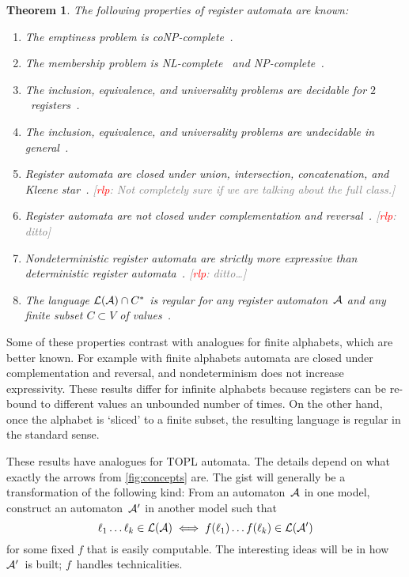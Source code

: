 \documentclass[9pt, preprint]{sigplanconf} %
\newcommand{\noterg}[2]{\textcolor{gray}{[\textcolor{red}{#1}: #2]}}
\newcommand{\rlp}[1]{\noterg{rlp}{#1}}
\newtheorem{theorem}{Theorem}
\theoremstyle{definition}
\theoremstyle{remark}
\begin{document}
\begin{theorem}\label{th:ra}
The following properties of register automata are known:
\begin{enumerate}
\item The emptiness problem is coNP-complete~\cite{dblp:journals/tcs/sakamotoi00}.
\item The membership problem is NL-complete~\cite{dblp:conf/mfcs/nevensv01} and NP-complete~\cite{dblp:journals/tcs/sakamotoi00}.
\item The inclusion, equivalence, and universality problems are decidable for $2$~registers~\cite{dblp:conf/focs/kaminskif90,dblp:conf/mfcs/nevensv01}.
\item The inclusion, equivalence, and universality problems are undecidable in general~\cite{dblp:conf/mfcs/nevensv01}.
\item Register automata are closed under union, intersection, concatenation, and Kleene star~\cite{dblp:conf/focs/kaminskif90}.
\rlp{Not completely sure if we are talking about the full class.}
\item Register automata are \emph{not} closed under complementation and reversal~\cite{dblp:conf/focs/kaminskif90}.
\rlp{ditto}
\item Nondeterministic register automata are strictly more expressive than deterministic register automata~\cite{dblp:conf/focs/kaminskif90}.
\rlp{ditto\ldots}
\item The language ${\cal L}({\cal A})\cap C^*$ is regular for any register automaton~${\cal A}$ and any finite subset $C\subset V$ of values~\cite{dblp:conf/focs/kaminskif90}.
\end{enumerate}
\end{theorem}

Some of these properties contrast with analogues for finite alphabets, which are better known.
For example with finite alphabets automata are closed under complementation and reversal, and nondeterminism does not increase expressivity.
These results differ for infinite alphabets because registers can be re-bound to different values an unbounded number of times.
On the other hand, once the alphabet is `sliced' to a finite subset, the resulting language is regular in the standard sense.

These results have analogues for TOPL automata.
The details depend on what exactly the arrows from \autoref{fig:concepts} are.
The gist will generally be a transformation of the following kind:
From an automaton~${\cal A}$ in one model, construct an automaton~${\cal A}'$ in another model such that
\[ \ell_1\ldots \ell_k \in {\cal L}({\cal A})
  \iff
f(\ell_1)\ldots f(\ell_k)\in{\cal L}({\cal A}') \]
for some fixed $f$ that is easily computable.
The interesting ideas will be in how ${\cal A}'$~is built;
$f$~handles technicalities.
\end{document}
